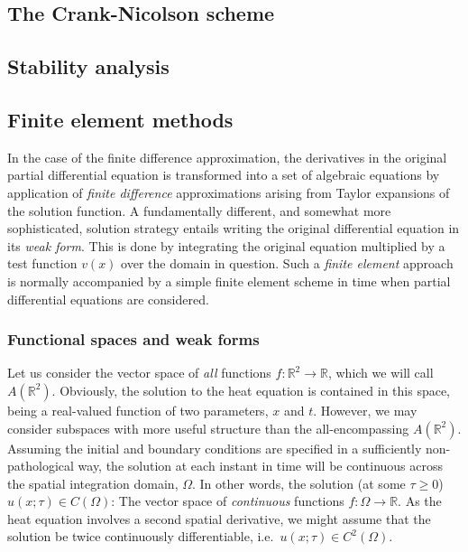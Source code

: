 \documentclass[a4paper, twocolumn]{article}
\begin{document}
\subsection{The Crank-Nicolson scheme}
\lipsum[3]

\subsection{Stability analysis \label{sect:finitestability}}
\lipsum[4]


\subsection{Finite element methods}
In the case of the finite difference approximation, the derivatives in the original partial differential equation is transformed into a set of algebraic equations by application of \textit{finite difference} approximations arising from Taylor expansions of the solution function. A fundamentally different, and somewhat more sophisticated, solution strategy entails writing the original differential equation in its \textit{weak form}. This is done by integrating the original equation multiplied by a test function $v(x)$ over the domain in question. Such a \textit{finite element} approach is normally accompanied by a simple finite element scheme in time when partial differential equations are considered. 

\subsubsection{Functional spaces and weak forms}
Let us consider the vector space of \textit{all} functions $f:\mathds{R}^2\rightarrow\mathds{R}$, which we will call $A(\mathds{R}^2)$. Obviously, the solution to the heat equation is contained in this space, being a real-valued function of two parameters, $x$ and $t$. However, we may consider subspaces with more useful structure than the all-encompassing $A(\mathds{R}^2)$. Assuming the initial and boundary conditions are specified in a sufficiently non-pathological way, the solution at each instant in time will be continuous across the spatial integration domain, $\Omega$. In other words, the solution (at some $\tau\ge0$) $u(x;\tau)\in C(\Omega)$: The vector space of \textit{continuous} functions $f:\Omega\rightarrow\mathds{R}$. As the heat equation involves a second spatial derivative, we might assume that the solution be twice continuously differentiable, i.e.\ $u(x;\tau)\in C^2(\Omega)$.
\end{document}
